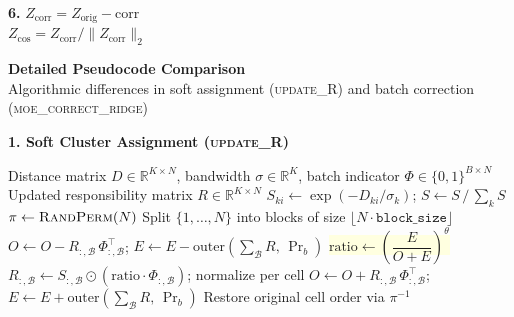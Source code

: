 \documentclass[8pt]{article}
\newlength{\colw}
\begin{document}
\begin{minipage}[t]{\colw}
\begin{stepbox}
\textbf{6.} $Z_\text{corr}\!=\!Z_\text{orig}-\text{corr}$\\
$Z_\text{cos}\!=\!Z_\text{corr}/\|Z_\text{corr}\|_2$
\end{stepbox}
\end{minipage}

\newpage

\begin{center}
{\large\bfseries Detailed Pseudocode Comparison}\\[3pt]
{\normalsize Algorithmic differences in soft assignment (\textsc{update\_R}) and batch correction (\textsc{moe\_correct\_ridge})}
\end{center}
\vspace{4pt}

{\large\bfseries 1. Soft Cluster Assignment (\textsc{update\_R})}

\vspace{3pt}

\begin{tcolorbox}[
    title={\textbf{Algorithm 1a:} Original Harmony --- Block-wise Heuristic Update},
    colback=white, colframe=black!60, fonttitle=\small\bfseries,
    boxrule=0.5pt, arc=2pt, left=4pt, right=4pt, top=2pt, bottom=2pt
]
\begin{algorithmic}[1]
\small
\Require Distance matrix $D \in \mathbb{R}^{K \times N}$, bandwidth $\sigma \in \mathbb{R}^K$, batch indicator $\Phi \in \{0,1\}^{B \times N}$
\Ensure Updated responsibility matrix $R \in \mathbb{R}^{K \times N}$
\State $S_{ki} \gets \exp(-D_{ki} / \sigma_k)$; \quad $S \gets S \,/\, \sum_k S$ 
\State $\pi \gets \textsc{RandPerm}(N)$ 
\State Split $\{1,\ldots,N\}$ into blocks of size $\lfloor N \cdot \texttt{block\_size} \rfloor$
    \State $O \gets O - R_{:,\mathcal{B}} \, \Phi_{:,\mathcal{B}}^\top$; \quad $E \gets E - \text{outer}(\sum_\mathcal{B} R, \, \Pr_b)$ 
    \State \colorbox{lightyellow}{$\text{ratio} \gets \left(\dfrac{E}{O + E}\right)^{\!\theta}$} \Comment{\textcolor{removed}{Heuristic diversity penalty}}
    \State $R_{:,\mathcal{B}} \gets S_{:,\mathcal{B}} \odot (\text{ratio} \cdot \Phi_{:,\mathcal{B}})$; \quad normalize per cell
    \State $O \gets O + R_{:,\mathcal{B}} \, \Phi_{:,\mathcal{B}}^\top$; \quad $E \gets E + \text{outer}(\sum_\mathcal{B} R, \, \Pr_b)$ 
\EndFor
\State Restore original cell order via $\pi^{-1}$
\end{algorithmic}
\end{tcolorbox}
\end{document}
